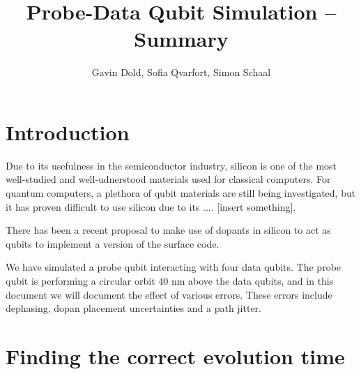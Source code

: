 



\usepackage{geometry}
\geometry{legalpaper, margin=1.0in}


\title{Probe-Data Qubit Simulation -- Summary}
\author{Gavin Dold, Sofia Qvarfort, Simon Schaal}
\maketitle
\tableofcontents
\section{Introduction}
Due to its usefulness in the semiconductor industry, silicon is one of the most well-studied and well-udnerstood materials used for classical computers. For quantum computers, a plethora of qubit materials are still being investigated, but it has proven difficult to use silicon due to its .... [insert something]. 

There has been a recent proposal to make use of dopants in silicon to act as qubits \cite{the paper} to implement a version of the surface code. 


We have simulated a probe qubit interacting with four data qubits. The probe qubit is performing a circular orbit $40$ nm above the data qubits, and in this document we will document the effect of various errors. These errors include dephasing, dopan placement uncertainties and a path jitter. 

\section{Finding the correct evolution time}

